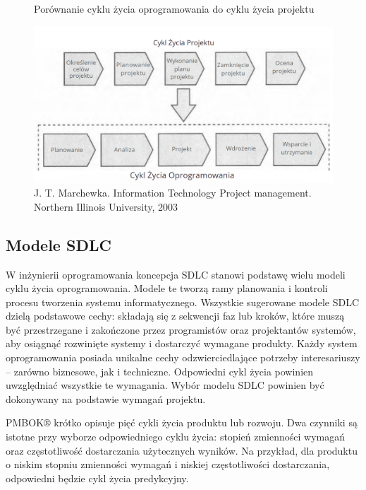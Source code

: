 \begin{figure}
    \centering
    \caption{Porównanie cyklu życia oprogramowania do cyklu życia projektu}
    \includegraphics[width=1\linewidth]{img/plc_PL.png}
    \caption*{J. T. Marchewka. Information Technology Project management. Northern Illinois University, 2003}
\end{figure}

\subsection{Modele SDLC}
W inżynierii oprogramowania koncepcja SDLC stanowi podstawę wielu modeli cyklu życia oprogramowania. Modele te tworzą ramy planowania i kontroli procesu tworzenia systemu informatycznego. \autocite{swebok} Wszystkie sugerowane modele SDLC dzielą podstawowe cechy: składają się z sekwencji faz lub kroków, które muszą być przestrzegane i zakończone przez programistów oraz projektantów systemów, aby osiągnąć rozwinięte systemy i dostarczyć wymagane produkty. \autocite{alshamrani2015comparison} Każdy system oprogramowania posiada unikalne cechy odzwierciedlające potrzeby interesariuszy – zarówno biznesowe, jak i techniczne. Odpowiedni cykl życia powinien uwzględniać wszystkie te wymagania. \autocite{swebok} Wybór modelu SDLC powinien być dokonywany na podstawie wymagań projektu. \autocite{arora2016analysis}

PMBOK® krótko opisuje pięć cykli życia produktu lub rozwoju. Dwa czynniki są istotne przy wyborze odpowiedniego cyklu życia: stopień zmienności wymagań oraz częstotliwość dostarczania użytecznych wyników. Na przykład, dla produktu o niskim stopniu zmienności wymagań i niskiej częstotliwości dostarczania, odpowiedni będzie cykl życia predykcyjny. \autocite{pmbok6}\autocite{ITPM}

